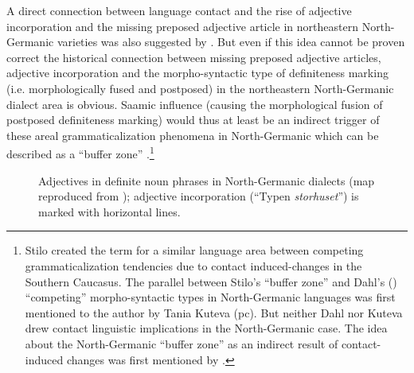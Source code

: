 {A direct connection between language contact and the rise of adjective incorporation and the missing preposed adjective article in northeastern North-Germanic varieties was also suggested by \cite{riesler2001a,riesler2002a}. But even if this idea cannot be proven correct the historical connection between missing preposed adjective articles, adjective incorporation and the morpho-syntactic type of definiteness marking (i.e. morphologically fused and postposed) in the northeastern North-Germanic dialect area is obvious. Saamic influence (causing the morphological fusion of postposed definiteness marking) would thus at least be an indirect trigger of these areal grammaticalization phenomena in North-Germanic which can be described as a “buffer zone” \citep{stilo2005}.\footnote{Stilo created the term for a similar language area between competing grammaticalization tendencies due to contact induced-changes in the Southern Caucasus. The parallel between Stilo's “buffer zone” and Dahl's (\citeyear{dahl2003}) “competing” morpho-syntactic types in North-Germanic languages was first mentioned to the author by Tania Kuteva (pc). But neither Dahl nor Kuteva drew contact linguistic implications in the North-Germanic case. The idea about the North-Germanic “buffer zone” as an indirect result of contact-induced changes was first mentioned by \cite{riesler2006a}.}
\begin{figure}[h]
\caption[Adjectives in definite noun phrases]{Adjectives in definite noun phrases in North-Germanic dialects (map reproduced from \citealt{delsing1996b}); adjective incorporation (“Typen \textit{storhuset}”) is marked with horizontal lines.}
\label{Delsing9}
\end{figure}

}
